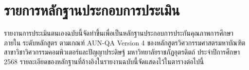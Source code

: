 

\section{รายการหลักฐานประกอบการประเมิน}

รายงานการประเมินตนเองฉบับนี้จัดทำขึ้นเพื่อเป็นหลักฐานประกอบการประกันคุณภาพการศึกษาภายใน ระดับหลักสูตร ตามเกณฑ์ AUN-QA Version 4 ของหลักสูตรวิศวกรรมศาสตรมหาบัณฑิต สาขาวิชาวิศวกรรมคอมพิวเตอร์และปัญญาประดิษฐ์ มหาวิทยาลัยราชภัฏอุตรดิตถ์ ประจำปีการศึกษา 2568 รายละเอียดของหลักฐานที่อ้างอิงในรายงานฉบับนี้จัดแสดงไว้ในตารางต่อไปนี้

